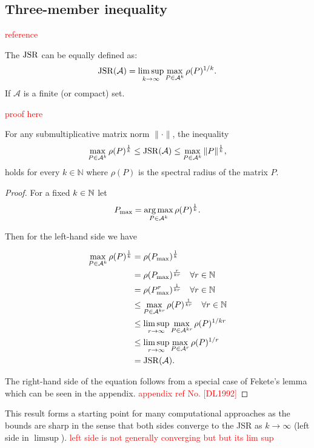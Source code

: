\subsection*{Three-member inequality}
\textcolor{red}{reference}
\begin{proposition}
    The $\operatorname{JSR}$ can be equally defined as:
    $$
    \operatorname{JSR}(\mathcal{A}) = \limsup_{k \to \infty} \max_{P \in \mathcal{A}^k} \rho(P)^{1/k}.
    $$
    If $\mathcal{A}$ is a finite (or compact) set.
\end{proposition}

\textcolor{red}{proof here}

\begin{proposition}
    For any submultiplicative matrix norm $\|\cdot\|$, the inequality
    \begin{equation}
    \max_{P \in \mathcal{A}^k} \rho(P)^{\frac{1}{k}} \leq \operatorname{JSR}(\mathcal{A}) \leq \max_{P \in \mathcal{A}^k} \| P\|^{\frac{1}{k}},
    \label{eq:three-member}
    \end{equation}
    holds for every $k \in \mathbb{N}$ where $\rho(P)$ is the spectral radius of the matrix $P$.
\end{proposition}
\begin{proof}
    For a fixed $k \in \mathbb{N}$ let 
    $$
    P_{\text{max}} = \operatorname*{arg\,max}_{P \in \mathcal{A}^k} \rho(P)^{\frac{1}{k}}.
    $$ 

    Then for the left-hand side we have

    \begin{align*}
        \max_{P \in \mathcal{A}^k} \rho(P)^{\frac{1}{k}} & = \rho(P_{\text{max}})^{\frac{1}{k}} \\
        & = \rho(P_{\text{max}})^{\frac{r}{kr}} \quad \forall r \in \mathbb{N} \\
        & = \rho(P_{\text{max}}^{r})^{\frac{1}{kr}} \quad \forall r \in \mathbb{N}\\
        & \leq \max_{P \in \mathcal{A}^{kr}} \rho(P)^{\frac{1}{kr}} \quad \forall r \in \mathbb{N}\\
        & \leq \limsup_{r \to \infty} \max_{P \in \mathcal{A}^{kr}} \rho(P)^{1/kr}\\
        & \leq \limsup_{r \to \infty} \max_{P \in \mathcal{A}^{r}} \rho(P)^{1/r}\\
        & = \operatorname{JSR}(\mathcal{A}).
    \end{align*}

    The right-hand side of the equation follows from a special case of Fekete's lemma which can be seen in the appendix. 
    \textcolor{red}{appendix ref No. [DL1992]} 
\end{proof}
This result forms a starting point for many computational approaches as the bounds are sharp in the sense that both sides converge to the JSR as $k\rightarrow \infty$ (left side in $\limsup$).
\textcolor{red}{left side is not generally converging but but its lim sup}

